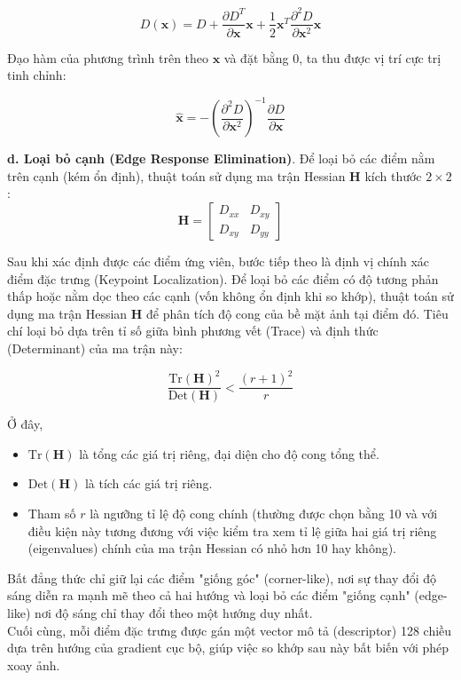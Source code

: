 $$D(\mathbf{x}) = D + \frac{\partial D^T}{\partial \mathbf{x}}\mathbf{x} + \frac{1}{2}\mathbf{x}^T \frac{\partial^2 D}{\partial \mathbf{x}^2} \mathbf{x}$$

Đạo hàm của phương trình trên theo $\mathbf{x}$ và đặt bằng 0, ta thu được vị trí cực trị tinh chỉnh:

$$\hat{\mathbf{x}} = - \left( \frac{\partial^2 D}{\partial \mathbf{x}^2} \right)^{-1} \frac{\partial D}{\partial \mathbf{x}}$$

\textbf{d. Loại bỏ cạnh (Edge Response Elimination)}. Để loại bỏ các điểm nằm trên cạnh (kém ổn định), thuật toán sử dụng ma trận Hessian $\mathbf{H}$ kích thước $2 \times 2$:$$\mathbf{H} = \begin{bmatrix} D_{xx} & D_{xy} \\ D_{xy} & D_{yy} \end{bmatrix}$$



Sau khi xác định được các điểm ứng viên, bước tiếp theo là định vị chính xác điểm đặc trưng (Keypoint Localization). Để loại bỏ các điểm có độ tương phản thấp hoặc nằm dọc theo các cạnh (vốn không ổn định khi so khớp), thuật toán sử dụng ma trận Hessian $\mathbf{H}$ để phân tích độ cong của bề mặt ảnh tại điểm đó. Tiêu chí loại bỏ dựa trên tỉ số giữa bình phương vết (Trace) và định thức (Determinant) của ma trận này:

$$\frac{\text{Tr}(\mathbf{H})^2}{\text{Det}(\mathbf{H})} < \frac{(r+1)^2}{r}$$

Ở đây,
\begin{itemize}
    \item $\text{Tr}(\mathbf{H})$ là tổng các giá trị riêng, đại diện cho độ cong tổng thể.
    \item $\text{Det}(\mathbf{H})$ là tích các giá trị riêng. 
    \item Tham số $r$ là ngưỡng tỉ lệ độ cong chính (thường được chọn bằng 10 và với  điều kiện này tương đương với việc kiểm tra xem tỉ lệ giữa hai giá trị riêng (eigenvalues) chính của ma trận Hessian có nhỏ hơn 10 hay không).
\end{itemize}

Bất đẳng thức chỉ giữ lại các điểm "giống góc" (corner-like), nơi sự thay đổi độ sáng diễn ra mạnh mẽ theo cả hai hướng và loại bỏ các điểm "giống cạnh" (edge-like) nơi độ sáng chỉ thay đổi theo một hướng duy nhất. \\

Cuối cùng, mỗi điểm đặc trưng được gán một vector mô tả (descriptor) 128 chiều dựa trên hướng của gradient cục bộ, giúp việc so khớp sau này bất biến với phép xoay ảnh.

